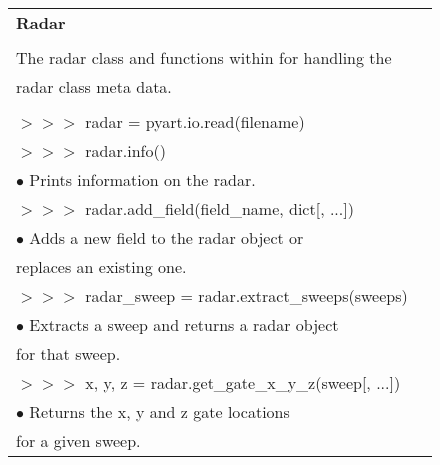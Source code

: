 \documentclass[potrait, z1paper, fontscale=0.33]{baposter} %
\begin{document}
\begin{poster}
{\begin{flushleft}
\begin{tabular}{@{}ll@{}}
\multicolumn{2}{l}{\cellcolor[HTML]{DDFFFF}\bf Radar} \\
\\
The radar class and functions within for handling the\\
radar class meta data.\\
\\
$>$$>$$>$ radar = pyart.io.read(filename)\\
$>$$>$$>$ radar.info()\\
\-\hspace{0.4cm} $\bullet$ Prints information on the radar.\\
$>$$>$$>$ radar.add\_field(field\_name, dict[, ...])\\
\-\hspace{0.4cm} $\bullet$ Adds a new field to the radar object or\\
\-\hspace{0.7cm} replaces an existing one.\\
$>$$>$$>$ radar\_sweep = radar.extract\_sweeps(sweeps)\\
\-\hspace{0.4cm} $\bullet$ Extracts a sweep and returns a radar object\\
\-\hspace{0.7cm} for that sweep.\\
$>$$>$$>$ x, y, z = radar.get\_gate\_x\_y\_z(sweep[, ...])\\
\-\hspace{0.4cm} $\bullet$ Returns the x, y and z gate locations\\
\-\hspace{0.7cm} for a given sweep.\\
\end{tabular}


\end{flushleft}}
\end{poster}
\end{document}
